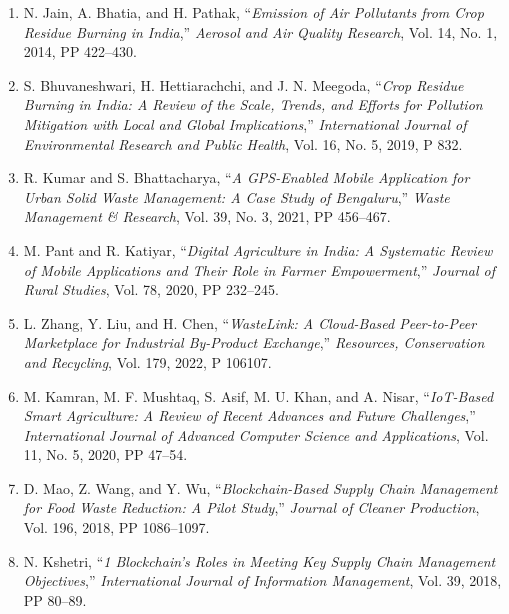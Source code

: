 \documentclass[a4paper,12pt,oneside]{report}
\let\originalitem\item
\renewcommand{\item}{\Needspace{10\baselineskip}\originalitem}
\begin{document}
\begin{enumerate}
    \item[{[27]}] \label{bib:jain2014} N. Jain, A. Bhatia, and H. Pathak, ``\textit{Emission of Air Pollutants from Crop Residue Burning in India},'' \textit{Aerosol and Air Quality Research}, Vol. 14, No. 1, 2014, PP 422--430.

    \item[{[28]}] \label{bib:bhuvaneshwari2019} S. Bhuvaneshwari, H. Hettiarachchi, and J. N. Meegoda, ``\textit{Crop Residue Burning in India: A Review of the Scale, Trends, and Efforts for Pollution Mitigation with Local and Global Implications},'' \textit{International Journal of Environmental Research and Public Health}, Vol. 16, No. 5, 2019, P 832.

    \item[{[29]}] \label{bib:kumar2021} R. Kumar and S. Bhattacharya, ``\textit{A GPS-Enabled Mobile Application for Urban Solid Waste Management: A Case Study of Bengaluru},'' \textit{Waste Management \& Research}, Vol. 39, No. 3, 2021, PP 456--467.

    \item[{[30]}] \label{bib:pant2020} M. Pant and R. Katiyar, ``\textit{Digital Agriculture in India: A Systematic Review of Mobile Applications and Their Role in Farmer Empowerment},'' \textit{Journal of Rural Studies}, Vol. 78, 2020, PP 232--245.

    \item[{[31]}] \label{bib:zhang2022} L. Zhang, Y. Liu, and H. Chen, ``\textit{WasteLink: A Cloud-Based Peer-to-Peer Marketplace for Industrial By-Product Exchange},'' \textit{Resources, Conservation and Recycling}, Vol. 179, 2022, P 106107.

    \item[{[32]}] \label{bib:kamran2020} M. Kamran, M. F. Mushtaq, S. Asif, M. U. Khan, and A. Nisar, ``\textit{IoT-Based Smart Agriculture: A Review of Recent Advances and Future Challenges},'' \textit{International Journal of Advanced Computer Science and Applications}, Vol. 11, No. 5, 2020, PP 47--54.

    \item[{[33]}] \label{bib:mao2018} D. Mao, Z. Wang, and Y. Wu, ``\textit{Blockchain-Based Supply Chain Management for Food Waste Reduction: A Pilot Study},'' \textit{Journal of Cleaner Production}, Vol. 196, 2018, PP 1086--1097.

    \item[{[34]}] \label{bib:kshetri2018} N. Kshetri, ``\textit{1 Blockchain's Roles in Meeting Key Supply Chain Management Objectives},'' \textit{International Journal of Information Management}, Vol. 39, 2018, PP 80--89.


\end{enumerate}
\end{document}
